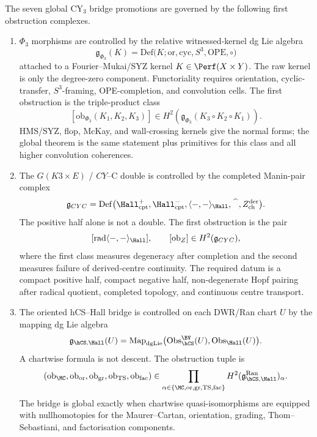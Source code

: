 \begin{proposition}
\label{prop:cy3-seven-first-obstruction-complexes}
The seven global CY$_3$ bridge promotions are governed by the following
first obstruction complexes.
\begin{enumerate}[label=\textup{(\roman*)}]
\item $\Phi_3$ morphisms are controlled by the relative witnessed-kernel
dg Lie algebra
\[
 \mathfrak g_{\Phi_3}(K)
 =
 \mathrm{Def}\bigl(K;\mathrm{or},\mathrm{cyc},S^3,\mathrm{OPE},\circ\bigr)
\]
attached to a Fourier--Mukai/SYZ kernel $K\in\Perf(X\times Y)$. The
raw kernel is only the degree-zero component. Functoriality requires
orientation, cyclic-transfer, $S^3$-framing, OPE-completion, and
convolution cells. The first obstruction is the triple-product class
\[
 [\mathrm{ob}_{\Phi_3}(K_1,K_2,K_3)]\in H^2(\mathfrak g_{\Phi_3}(K_3\circ K_2\circ K_1)).
\]
HMS/SYZ, flop, McKay, and wall-crossing kernels give the normal forms;
the global theorem is the same statement plus primitives for this class
and all higher convolution coherences.

\item The $G(K3\times E)$ / $CY$--C double is controlled by the
completed Manin-pair complex
\[
 \mathfrak g_{CYC}
 =
 \mathrm{Def}\bigl(\Hall^+_{\mathrm{cpt}},\Hall^-_{\mathrm{cpt}},
 \langle-,-\rangle_{\Hall},\widehat{\phantom A},
 Z^{\mathrm{der}}_{\mathrm{ch}}\bigr).
\]
The positive half alone is not a double. The first obstruction is the
pair
\[
 [\mathrm{rad}\langle-,-\rangle_{\Hall}],\qquad
 [\mathrm{ob}_Z]\in H^2(\mathfrak g_{CYC}),
\]
where the first class measures degeneracy after completion and the
second measures failure of derived-centre continuity. The required
datum is a compact positive half, compact negative half, non-degenerate
Hopf pairing after radical quotient, completed topology, and continuous
centre transport.

\item The oriented hCS--Hall bridge is controlled on each DWR/Ran chart
$U$ by the mapping dg Lie algebra
\[
 \mathfrak g_{\hCS,\Hall}(U)
 =
 \mathrm{Map}_{\mathrm{dgLie}}\bigl(\mathrm{Obs}^{\BV}_{\hCS}(U),
 \mathrm{Obs}_{\Hall}(U)\bigr).
\]
A chartwise formula is not descent. The obstruction tuple is
\[
 (\mathrm{ob}_{\MC},\mathrm{ob}_{\mathrm{or}},\mathrm{ob}_{\mathrm{gr}},
 \mathrm{ob}_{\mathrm{TS}},\mathrm{ob}_{\mathrm{fac}})
 \in
 \prod_{\alpha\in\{\MC,\mathrm{or},\mathrm{gr},\mathrm{TS},\mathrm{fac}\}}
 H^2(\mathfrak g_{\hCS,\Hall}^{\mathrm{Ran}})_\alpha .
\]
The bridge is global exactly when chartwise quasi-isomorphisms are
equipped with nullhomotopies for the Maurer--Cartan, orientation,
grading, Thom--Sebastiani, and factorisation components.


\end{enumerate}
\end{proposition}
